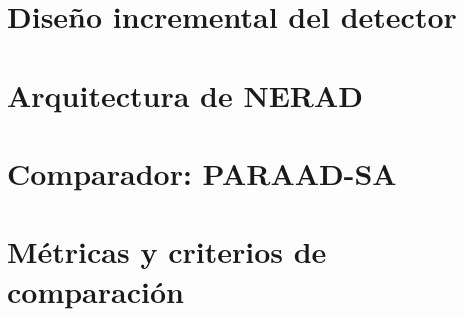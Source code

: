 \section{Diseño incremental del detector}
\label{sec:escalera}

\section{Arquitectura de NERAD}
\label{sec:arquitectura}

\section{Comparador: PARAAD-SA}
\label{sec:comparador}

\section{Métricas y criterios de comparación}
\label{sec:metricas}
